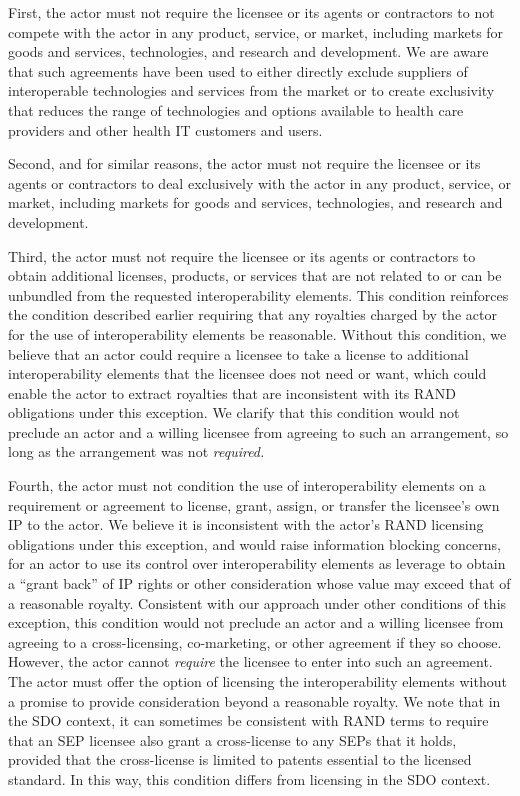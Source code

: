 \documentclass[twoside,11pt]{article}
\begin{document}
          First, the actor must not require the licensee or its agents or contractors to not compete with the actor in any product, service, or market, including markets for goods and services, technologies, and research and development. We are aware that such agreements have been used to either directly exclude suppliers of interoperable technologies and services from the market or to create exclusivity that reduces the range of technologies and options available to health care providers and other health IT customers and users.


          Second, and for similar reasons, the actor must not require the licensee or its agents or contractors to deal exclusively with the actor in any product, service, or market, including markets for goods and services, technologies, and research and development.



          Third, the actor must not require the licensee or its agents or contractors to obtain additional licenses, products, or services that are not related to or can be unbundled from the requested interoperability elements. This condition reinforces the condition described earlier requiring that any royalties charged by the actor for the use of interoperability elements be reasonable. Without this condition, we believe that an actor could require a licensee to take a license to additional interoperability elements that the licensee does not need or want, which could enable the actor to extract royalties that are inconsistent with its RAND obligations under this exception. We clarify that this condition would not preclude an actor and a willing licensee from agreeing to such an arrangement, so long as the arrangement was not \emph{required.}
          



          Fourth, the actor must not condition the use of interoperability elements on a requirement or agreement to license, grant, assign, or transfer the licensee's own IP to the actor. We believe it is inconsistent with the actor's RAND licensing obligations under this exception, and would raise information blocking concerns, for an actor to use its control over interoperability elements as leverage to obtain a “grant back” of IP rights or other consideration whose value may exceed that of a reasonable royalty. Consistent with our approach under other conditions of this exception, this condition would not preclude an actor and a willing licensee from agreeing to a cross-licensing, co-marketing, or other agreement if they so choose. However, the actor cannot \emph{require} the licensee to enter into such an agreement. The actor must offer the option of licensing the interoperability elements without a promise to provide consideration beyond a reasonable royalty. We note that in the SDO context, it can sometimes be consistent with RAND terms to require that an SEP licensee also grant a cross-license to any SEPs that it holds, provided that the cross-license is limited to patents essential to the licensed standard. In this way, this condition differs from licensing in the SDO context.
\end{document}
